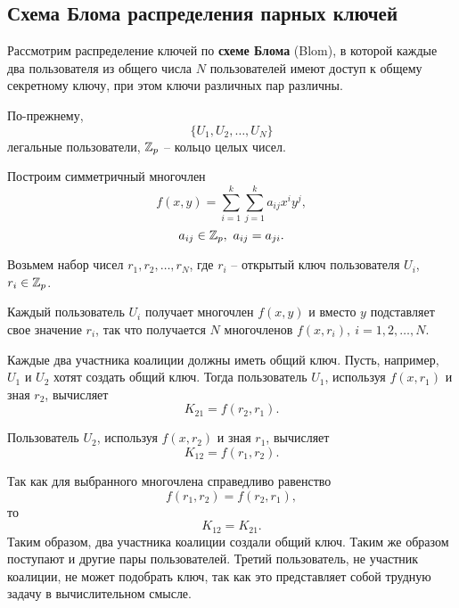 \subsection{Схема Блома распределения парных ключей}

Рассмотрим распределение ключей по \textbf{схеме Блома} (Blom), в которой каждые два пользователя из общего числа $N$ пользователей имеют доступ к общему секретному ключу, при этом ключи различных пар различны.

По-прежнему,
    \[ \{ U_1, U_2, \dots, U_N \} \]
легальные пользователи, $\mathbb{Z}_p$ -- кольцо целых чисел.

Построим симметричный многочлен
    \[ f(x,y) = \sum_{i=1}^k \sum_{j=1}^k a_{ij} x^i y^j, \]
    \[ a_{ij} \in \mathbb{Z}_p, ~ a_{ij} = a_{ji}. \]

Возьмем набор чисел $r_1, r_2, \dots, r_N$, где $r_i$ -- открытый ключ пользователя $U_i$, ~ $r_i \in \mathbb{Z}_p$.

Каждый пользователь $U_i$ получает многочлен $f(x,y)$ и вместо $y$ подставляет свое значение $r_i$, так что получается $N$ многочленов $f(x, r_i), ~ i = 1, 2, \dots, N$.

Каждые два участника коалиции должны иметь общий ключ. Пусть, например, $U_1$ и $U_2$ хотят создать общий ключ. Тогда пользователь $U_1$, используя $f(x, r_1)$ и зная $r_2$, вычисляет
    \[ K_{21} = f(r_2, r_1). \]

Пользователь $U_2$, используя $f(x, r_2)$ и зная $r_1$, вычисляет
    \[ K_{12} = f(r_1, r_2). \]

Так как для выбранного многочлена справедливо равенство
    \[ f(r_1, r_2) = f(r_2, r_1), \]
то
    \[ K_{12} = K_{21}. \]
Таким образом, два участника коалиции создали общий ключ. Таким же образом поступают и другие пары пользователей. Третий пользователь, не участник коалиции, не может подобрать ключ, так как это представляет собой трудную задачу в вычислительном смысле.

